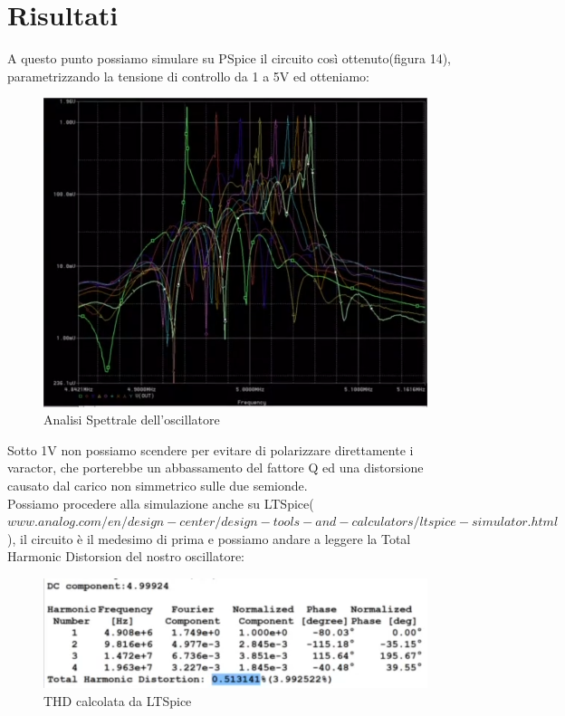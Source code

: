 \documentclass{article}
\begin{document}
\section{Risultati}
A questo punto possiamo simulare su PSpice il circuito così ottenuto(figura 14), parametrizzando la tensione di controllo da 1 a 5V ed otteniamo:
~\begin{figure}[H]
\includegraphics[scale=0.7]{AnalisiSpettraleFinale.png}
\centering
\caption{Analisi Spettrale dell'oscillatore}
\label{fig:foo}
\end{figure}
Sotto 1V non possiamo scendere per evitare di polarizzare direttamente i varactor, che porterebbe un abbassamento del fattore Q ed una distorsione causato dal carico non simmetrico sulle due semionde.\\Possiamo procedere alla simulazione anche su LTSpice($www.analog.com/en/design-center/design-tools-and-calculators/ltspice-simulator.html$), il circuito è il medesimo di prima e possiamo andare a leggere la Total Harmonic Distorsion del nostro oscillatore:
~\begin{figure}[H]
\includegraphics[width=\textwidth]{THDLT.png}
\centering
\caption{THD calcolata da LTSpice}
\label{fig:foo}
\end{figure}
\end{document}

